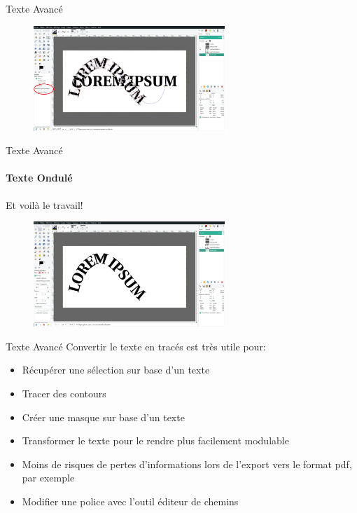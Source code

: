 \begin{frame}{Texte Avancé}
\begin{enumerate}
{				\begin{figure}
					\centering
					\includegraphics[height=150px]{Images/text/courb4}
				\end{figure}
			}
		\end{enumerate}
\end{frame}


\begin{frame}{Texte Avancé}
	\framesubtitle{Texte Ondulé}
	Et voilà le travail!
	\begin{figure}
	\centering
		\includegraphics[height=150px]{Images/text/courb5}
	\end{figure}
\end{frame}

\begin{frame}{Texte Avancé}
	Convertir le texte en tracés est très utile pour:
	\begin{itemize}
	\item Récupérer une sélection sur base d'un texte
	\item Tracer des contours
	\item Créer une masque sur base d'un texte
	\item Transformer le texte pour le rendre plus facilement modulable
	\item Moins de risques de pertes d'informations lors de l'export vers le format pdf, par exemple
	\item Modifier une police avec l'outil éditeur de chemins
	\end{itemize}
\end{frame}


